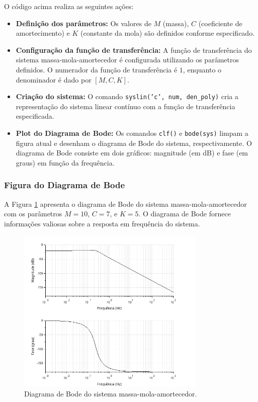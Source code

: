 O código acima realiza as seguintes ações:
\begin{itemize}
    \item \textbf{Definição dos parâmetros:} Os valores de \( M \) (massa), \( C \) (coeficiente de amortecimento) e \( K \) (constante da mola) são definidos conforme especificado.
    \item \textbf{Configuração da função de transferência:} A função de transferência do sistema massa-mola-amortecedor é configurada utilizando os parâmetros definidos. O numerador da função de transferência é \(1\), enquanto o denominador é dado por \([M, C, K]\).
    \item \textbf{Criação do sistema:} O comando \texttt{syslin('c', num, den\_poly)} cria a representação do sistema linear contínuo com a função de transferência especificada.
    \item \textbf{Plot do Diagrama de Bode:} Os comandos \texttt{clf()} e \texttt{bode(sys)} limpam a figura atual e desenham o diagrama de Bode do sistema, respectivamente. O diagrama de Bode consiste em dois gráficos: magnitude (em dB) e fase (em graus) em função da frequência.
\end{itemize}

\subsubsection{Figura do Diagrama de Bode}

A Figura \ref{fig:Bode} apresenta o diagrama de Bode do sistema massa-mola-amortecedor com os parâmetros \(M = 10\), \(C = 7\), e \(K = 5\). O diagrama de Bode fornece informações valiosas sobre a resposta em frequência do sistema.

\begin{figure}[h]
    \centering
    \includegraphics[width=0.8\textwidth]{atividades/8-atividade/assets/bode.png}
    \caption{Diagrama de Bode do sistema massa-mola-amortecedor.}
    \label{fig:Bode}
\end{figure}

